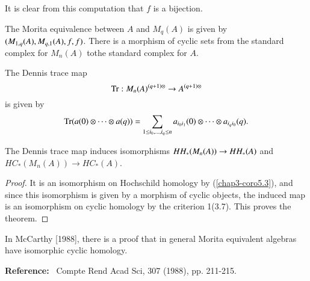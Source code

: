 It is clear from this computation that $f$ is a bijection.

The Morita equivalence between $A$ and $M_{q}(A)$ is given by
$(M_{1,q}(A),\break M_{q,1}(A),f,f)$. There is a morphism of cyclic sets from
the standard complex for $M_{n}(A)$ to\pageoriginale the standard
complex for $A$.

\begin{definition}\label{chap3-defi5.5}
The Dennis trace map
$$
\operatorname{Tr}:M_{n}(A)^{(q+1)\otimes}\to A^{(q+1)\otimes}
$$
is given by
$$
\operatorname{Tr}(a(0)\otimes\cdots\otimes a(q))=\sum\limits_{1\leq
  i_{0},\ldots,i_{q}\leq n} a_{i_{0}i_{1}}(0)\otimes\cdots\otimes
a_{i_{q}i_{0}}(q). 
$$
\end{definition}

\begin{theorem}\label{chap3-thm5.6}
The Dennis trace map induces isomorphisms
$HH_{\ast}(M_{n}\break (A))\to
HH_{\ast}(A)$ and $HC_{\ast}(M_{n}(A))\to HC_{\ast}(A)$. 
\end{theorem}

\begin{proof}
It is an isomorphism on Hochschild homology by (\ref{chap3-coro5.3}),
and since this isomorphism is given by a morphism of cyclic objects,
the induced map is an isomorphism on cyclic homology by the criterion
1(3.7). This proves the theorem.
\end{proof}

\begin{remark}\label{chap3-rem5.7}
In McCarthy [1988], there is a proof that in general Morita equivalent
algebras have isomorphic cyclic homology.
\end{remark}

\noindent
{\bf Reference:}~ Compte Rend Acad Sci, 307 (1988), pp. 211-215.


